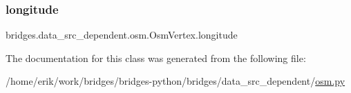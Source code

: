 \subsubsection{\texorpdfstring{longitude}{longitude}}
{\footnotesize\ttfamily bridges.\+data\+\_\+src\+\_\+dependent.\+osm.\+Osm\+Vertex.\+longitude}



The documentation for this class was generated from the following file\+:\begin{DoxyCompactItemize}
\item 
/home/erik/work/bridges/bridges-\/python/bridges/data\+\_\+src\+\_\+dependent/\hyperlink{osm_8py}{osm.\+py}\end{DoxyCompactItemize}
